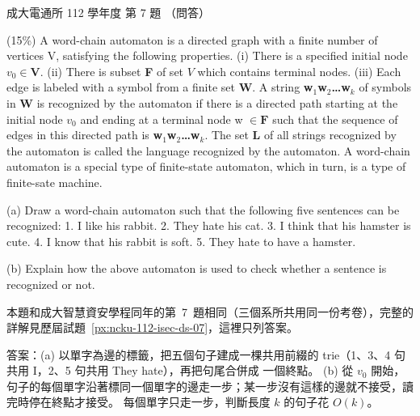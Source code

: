\begin{pastexam}[label={px:ncku-112-cce-ds-07}]{成大電通所 112 學年度 第 7 題}
（問答）

(15\%) A word-chain automaton is a directed graph with a finite number of vertices V, satisfying the
following properties. (i) There is a specified initial node $v_0\in \boldsymbol{V}$. (ii) There is
subset \textbf{F} of set $V$ which contains terminal nodes. (iii) Each edge is labeled with a symbol
from a finite set \textbf{W}. A string \textbf{w$_1$w$_2$\ldots w$_k$} of symbols in \textbf{W} is
recognized by the automaton if there is a directed path starting at the initial node $v_0$ and
ending at a terminal node w $\in \boldsymbol{F}$ such that the sequence of edges in this directed
path is \textbf{w$_1$w$_2$\ldots w$_k$}. The set \textbf{L} of all strings recognized by the
automaton is called the language recognized by the automaton. A word-chain automaton is a special
type of finite-state automaton, which in turn, is a type of finite-sate machine.

(a) Draw a word-chain automaton such that the following five sentences can be recognized: 1. I like
his rabbit. 2. They hate his cat. 3. I think that his hamster is cute. 4. I know that his rabbit
is soft. 5. They hate to have a hamster.

(b) Explain how the above automaton is used to check whether a sentence is recognized or not.
\end{pastexam}

\begin{pastsoln}
本題和成大智慧資安學程同年的第~7~題相同（三個系所共用同一份考卷），完整的詳解見歷屆試題~\ref{px:ncku-112-isec-ds-07}，這裡只列答案。

答案：(a) 以單字為邊的標籤，把五個句子建成一棵共用前綴的 trie（1、3、4 句共用 I，2、5 句共用 They hate），再把句尾合併成
一個終點。 (b) 從 $v_0$ 開始，句子的每個單字沿著標同一個單字的邊走一步；某一步沒有這樣的邊就不接受，讀完時停在終點才接受。
每個單字只走一步，判斷長度 $k$ 的句子花 $O(k)$。
\end{pastsoln}
